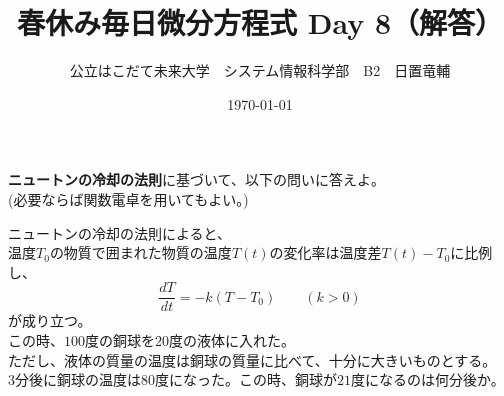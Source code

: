 \documentclass[dvipdfmx,uplatex]{jsarticle}
\title{春休み毎日微分方程式 Day 8（解答）}
\author{公立はこだて未来大学　システム情報科学部　B2　日置竜輔}
\date{\today}
\begin{document}
\begin{spacing}{1.6}
\maketitle

{\bf ニュートンの冷却の法則}に基づいて、以下の問いに答えよ。\\
(必要ならば関数電卓を用いてもよい。)
\begin{qparts}
  \qpart
  ニュートンの冷却の法則によると、\\
  温度$T_0$の物質で囲まれた物質の温度$T(t)$の変化率は温度差$T(t) - T_0$に比例し、
  \begin{equation}
    \frac{dT}{dt} = -k(T - T_0) \qquad (k > 0)\nonumber
  \end{equation}
  が成り立つ。\\
  この時、$100$度の銅球を$20$度の液体に入れた。\\
  ただし、液体の質量の温度は銅球の質量に比べて、十分に大きいものとする。\\
  $3$分後に銅球の温度は$80$度になった。この時、銅球が$21$度になるのは何分後か。\\


\end{qparts}
\end{spacing}
\end{document}
